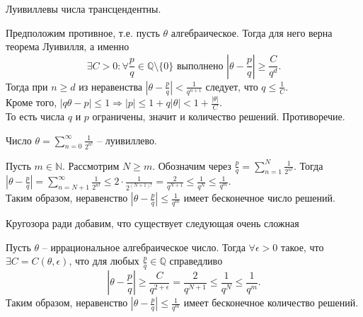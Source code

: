 \begin{proposition} \label{l9_prp}
	Луивиллевы числа трансцендентны.
\end{proposition}
\begin{pf}
	Предположим противное, т.е. пусть $\theta$ алгебраическое. Тогда для него верна теорема Луивилля, а именно
	$$\exists C > 0:  \forall  \frac{p}{q} \in \mathbb{Q} \setminus \lbrace 0 \rbrace \text{ выполнено }  \left|\theta - \frac{p}{q}\right| \geq \frac{C}{q^d}.$$
	Тогда при $n \geq d$ из неравенства $\displaystyle \left|\theta - \frac{p}{q}\right| < \frac{1}{q^{n + 1}}$ следует, что $\displaystyle q \leq \frac{1}{C}$.\\
	Кроме того, $\displaystyle \left|q \theta - p\right| \leq 1 \Rightarrow |p| \leq 1 + q|\theta| < 1 + \frac{|\theta|}{C}.$\\
	То есть числа $q$ и $p$ ограничены, значит и количество решений. Противоречие.
\end{pf}

\begin{example}
	Число $\displaystyle \theta = \sum_{n = 0}^{\infty} \frac{1}{2^{n!}}$ -- луивиллево.
\end{example}
\begin{pf}
	Пусть $m \in \mathbb{N}$. Рассмотрим $N \geq m$. Обозначим через $\displaystyle \frac{p}{q} = \sum_{n = 1}^{N} \frac{1}{2^{n!}}$. Тогда $\displaystyle \left| \theta - \frac{p}{q} \right| = \sum_{n = N + 1}^{\infty} \frac{1}{2^{n!}} \leq 2 \cdot \frac{1}{2^{(N+1)!}} = \frac{2}{q^{N + 1}} \leq \frac{1}{q^N} \leq \frac{1}{q^m}$.\\
	Таким образом, неравенство $\displaystyle \left| \theta - \frac{p}{q} \right| \leq \frac{1}{q^m}$ имеет бесконечное число решений.
\end{pf}

Кругозора ради добавим, что существует следующая очень сложная

\begin{theorem}
	Пусть $\theta$ -- иррациональное алгебраическое число. Тогда $\forall \epsilon > 0$ такое, что $\exists C = C(\theta, \epsilon)$, что для любых $\frac{p}{q} \in \mathbb{Q}$ справедливо
	$$\left|\theta - \frac{p}{q}\right| \geq \frac{C}{q^{2 + \epsilon}} = \frac{2}{q^{N+1}} \leq \frac{1}{q^N} \leq \frac{1}{q^m}.$$
	Таким образом, неравенство $\displaystyle \left|\theta - \frac{p}{q}\right| \leq \frac{1}{q^m}$ имеет бесконечное количество решений.
\end{theorem}~\\

